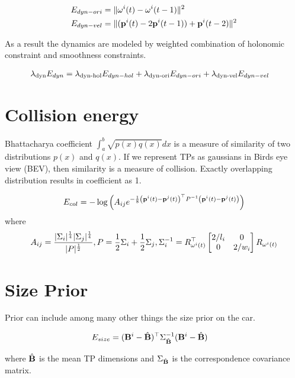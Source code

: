 \begin{align}
  E_{dyn-ori} &= \|\mathbf{\omega}^{i}(t) - \mathbf{\omega}^{i}(t-1)\|^2\\
  E_{dyn-vel} &= \|(\mathbf{p}^{i}({t}) - 2\mathbf{p}^{i}({t-1})) + \mathbf{p}^{i}({t-2})\|^2
\end{align}

As a result the dynamics are modeled by weighted combination of holonomic
constraint and smoothness constraints.

\begin{align}
  \lambda_{\text{dyn}}E_{dyn} &= \lambda_{\text{dyn-hol}}E_{dyn-hol} + \lambda_{\text{dyn-ori}}E_{dyn-ori} + \lambda_{\text{dyn-vel}}E_{dyn-vel}
\end{align}

 
\section{Collision energy}

Bhattacharya coefficient $\int_a^b\sqrt{p(x)q(x)}dx$ is a measure of similarity
of two distributions $p(x)$ and $q(x)$. If we represent TPs as gaussians in
Birds eye view (BEV), then similarity is a measure of collision. Exactly
overlapping distribution results in coefficient as 1. 

\begin{align}
  \label{eq:collisionEnergyHellingerDistance}
  E_{col} =
  -\log\left(
  A_{ij}
  e^{-\frac{1}{8}
    \left(\mathbf{p}^{i}({t}) - \mathbf{p}^{j}({t})\right)^\top
    P^{-1}
    \left(\mathbf{p}^{i}({t}) - \mathbf{p}^{j}({t})\right)
    }
    \right)
\end{align}
where 
\begin{multline}
  A_{ij} = \frac{|\Sigma_i|^\frac{1}{4}|\Sigma_j|^\frac{1}{4}}{|P|^\frac{1}{2}}, \hfill
  P = \frac{1}{2}\Sigma_i + \frac{1}{2}\Sigma_j, \hfill
\Sigma_i^{-1} = R^\top_{\ori{i}{t}} \begin{bmatrix} 2/l_i & 0 \\ 0 & 2/w_i \end{bmatrix}
R_{\ori{i}{t}}
\end{multline}


\section{Size Prior}

Prior can include among many other things the size prior on the car.

\begin{align}
  \label{eq:totalSizeEnergy}
  E_{size} &= (\mathbf{B}^{i} - \hat{\mathbf{B}})^\top\Sigma_{\hat{\mathbf{B}}}^{-1}(\mathbf{B}^{i} -
  \hat{\mathbf{B}})
\end{align}

where $\hat{\mathbf{B}}$ is the mean TP dimensions and
$\Sigma_{\hat{\mathbf{B}}}$ is the correspondence covariance matrix.
